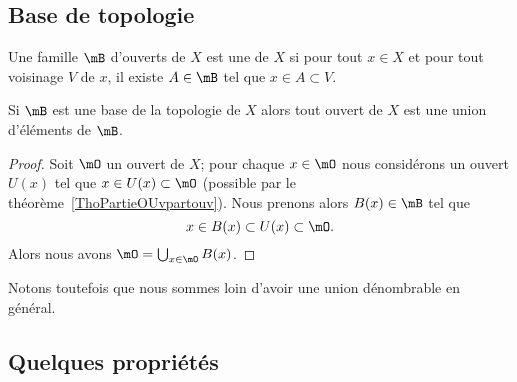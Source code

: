 \subsection{Base de topologie}

\begin{definition}   \label{DefQELfbBEyiB}
    Une famille \( \mB\) d'ouverts de \( X\) est une  de \( X\) si pour tout \( x\in X\) et pour tout voisinage \( V\) de \( x\), il existe \( A\in \mB\) tel que \( x\in A\subset V\).
\end{definition}

\begin{proposition} \label{PropMMKBjgY}
    Si \( \mB\) est une base de la topologie de \( X\) alors tout ouvert de \( X\) est une union d'éléments de \( \mB\).
\end{proposition}

\begin{proof}
    Soit \( \mO\) un ouvert de \( X\); pour chaque \( x\in\mO\) nous considérons un ouvert \( U(x)\) tel que \( x\in U(x)\subset \mO\) (possible par le théorème~\ref{ThoPartieOUvpartouv}). Nous prenons alors \( B(x)\in\mB\) tel que
    \begin{equation}
        x\in B(x)\subset U(x)\subset \mO.
    \end{equation}
    Alors nous avons \( \mO=\bigcup_{x\in \mO}B(x)\).
\end{proof}
Notons toutefois que nous sommes loin d'avoir une union dénombrable en général.

\subsection{Quelques propriétés}


